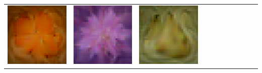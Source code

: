 {\begin{center}
\begin{tabular}{ccccccccccc}
    \includegraphics[align=c,width=\coverwidth\linewidth]{figures/cover/cifar/orange_0.pdf} &
    \includegraphics[align=c,width=\coverwidth\linewidth]{figures/cover/cifar/orchid_0.pdf} &
    \includegraphics[align=c,width=\coverwidth\linewidth]{figures/cover/cifar/pear_0.pdf} &

\end{tabular}
\end{center}}
